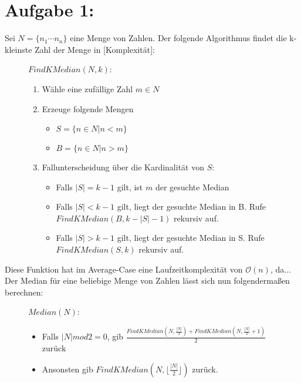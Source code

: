 \section*{Aufgabe 1: }
\newcommand{\floor}[1]{\lfloor #1 \rfloor}
Sei $N = \{n_1 \cdots n_n\}$ eine Menge von Zahlen. Der folgende Algorithmus findet die k-kleinste Zahl der Menge in [Komplexität]:\\
\begin{center}
  \begin{figure}[ht]
    $FindKMedian(N, k)$:
    \begin{enumerate}
    \item Wähle eine zufällige Zahl $m \in N$
    \item Erzeuge folgende Mengen
      \begin{itemize}
      \item $S = \{n \in N | n < m\}$
      \item $B = \{n \in N | n > m\}$
      \end{itemize}
    \item Fallunterscheidung über die Kardinalität von $S$:
      \begin{itemize}
      \item Falls $|S| = k - 1$ gilt, ist $m$ der gesuchte Median
      \item Falls $|S| < k - 1$ gilt, liegt der gesuchte Median in B. Rufe $FindKMedian(B, k - |S| - 1)$ rekursiv auf.
      \item Falls $|S| > k - 1$ gilt, liegt der gesuchte Median in S. Rufe $FindKMedian(S, k)$ rekursiv auf.
      \end{itemize}
    \end{enumerate}
  \end{figure}
\end{center}
Diese Funktion hat im Average-Case eine Laufzeitkomplexität von $\mathcal{O}(n)$, da...\\

Der Median für eine beliebige Menge von Zahlen lässt sich nun folgendermaßen berechnen:
\begin{center}
  \begin{figure}[ht]
    $Median(N)$:
    \begin{itemize}
    \item Falls $|N| mod 2 = 0$, gib $\frac{FindKMedian(N, \frac{|N|}{2}) + FindKMedian(N, \frac{|N|}{2} + 1)}{2}$ zurück
    \item Ansonsten gib $FindKMedian(N, \floor{\frac{|N|}{2}})$ zurück.
    \end{itemize}
  \end{figure}
\end{center}
